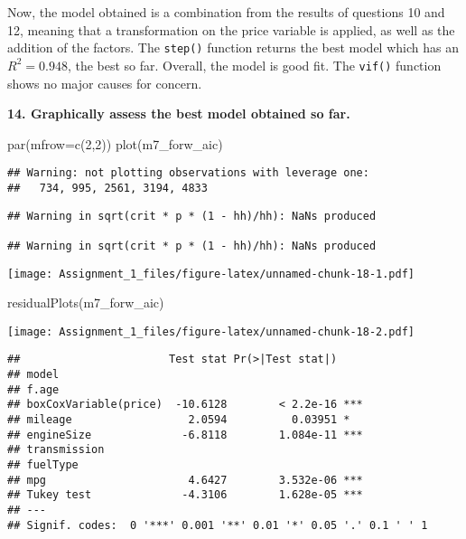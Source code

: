 \documentclass[
]{article}
\newenvironment{Shaded}{\begin{snugshade}}{\end{snugshade}}
\newcommand{\AttributeTok}[1]{\textcolor[rgb]{0.77,0.63,0.00}{#1}}
\newcommand{\DecValTok}[1]{\textcolor[rgb]{0.00,0.00,0.81}{#1}}
\newcommand{\FunctionTok}[1]{\textcolor[rgb]{0.00,0.00,0.00}{#1}}
\newcommand{\NormalTok}[1]{#1}
\begin{document}
Now, the model obtained is a combination from the results of questions
10 and 12, meaning that a transformation on the price variable is
applied, as well as the addition of the factors. The \texttt{step()}
function returns the best model which has an \(R^2 = 0.948\), the best
so far. Overall, the model is good fit. The \texttt{vif()} function
shows no major causes for concern.

\newpage

\textbf{14. Graphically assess the best model obtained so far.}

\begin{Shaded}
\begin{Highlighting}[]
\FunctionTok{par}\NormalTok{(}\AttributeTok{mfrow=}\FunctionTok{c}\NormalTok{(}\DecValTok{2}\NormalTok{,}\DecValTok{2}\NormalTok{))}
\FunctionTok{plot}\NormalTok{(m7\_forw\_aic)}
\end{Highlighting}
\end{Shaded}

\begin{verbatim}
## Warning: not plotting observations with leverage one:
##   734, 995, 2561, 3194, 4833
\end{verbatim}

\begin{verbatim}
## Warning in sqrt(crit * p * (1 - hh)/hh): NaNs produced

## Warning in sqrt(crit * p * (1 - hh)/hh): NaNs produced
\end{verbatim}

\texttt{[image: Assignment\_1\_files/figure-latex/unnamed-chunk-18-1.pdf]}

\begin{Shaded}
\begin{Highlighting}[]
\FunctionTok{residualPlots}\NormalTok{(m7\_forw\_aic)}
\end{Highlighting}
\end{Shaded}

\texttt{[image: Assignment\_1\_files/figure-latex/unnamed-chunk-18-2.pdf]}

\begin{verbatim}
##                       Test stat Pr(>|Test stat|)    
## model                                               
## f.age                                               
## boxCoxVariable(price)  -10.6128        < 2.2e-16 ***
## mileage                  2.0594          0.03951 *  
## engineSize              -6.8118        1.084e-11 ***
## transmission                                        
## fuelType                                            
## mpg                      4.6427        3.532e-06 ***
## Tukey test              -4.3106        1.628e-05 ***
## ---
## Signif. codes:  0 '***' 0.001 '**' 0.01 '*' 0.05 '.' 0.1 ' ' 1
\end{verbatim}
\end{document}
